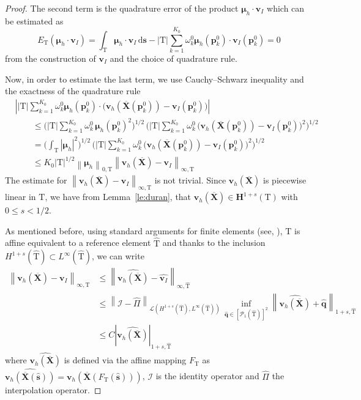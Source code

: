 \documentclass[oneside]{amsart} %
\newcommand{\norm}[1]{\left\lVert#1\right\rVert}
\newcommand{\abs}[1]{\left\lvert#1\right\rvert}
\renewcommand\v{\mathbf{v}} %
\newcommand\s{\mathbf{s}} %
\renewcommand\H{\mathbf{H}}
\newcommand\X{\mathbf{X}} %
\newcommand\Xbar{\overline{\X}} %
\newcommand\mmu{{\boldsymbol\mu}} %
\newcommand\ds{\mathrm{d}\s} %
\newcommand\quadnode{\mathbf{p}}
\newcommand\quadweigth{\omega}
\newcommand\Pcal{\mathcal{P}}
\newcommand\tri{\mathrm{T}} %
\newcommand\reftri{\widehat{\tri}} %
\begin{document}
\begin{proof}
		The second term is the quadrature error of the product $\mmu_h\cdot\v_I$ which
		can be estimated as
		\begin{equation}
			E_\tri(\mmu_h\cdot\v_I) = \int_\tri \mmu_h\cdot\v_I\,\ds
			- \abs{\tri}\sum_{k=1}^{K_0}\quadweigth_k^0\mmu_h(\quadnode_k^0)
			\cdot\v_I(\quadnode_k^0) = 0
		\end{equation}
		from the construction of $\v_I$ and the choice of quadrature rule.
		
		Now, in order to estimate the last term, we use Cauchy--Schwarz
		inequality and the exactness of the quadrature rule
		\begin{equation}\label{eq:3rd_part1_l2}
			\begin{aligned}
				&\abs{\abs{\tri} \sum_{k=1}^{K_0}\quadweigth_k^0 \mmu_h(\quadnode_k^0)\cdot
					\big(\v_h(\Xbar(\quadnode_k^0))-\v_I(\quadnode_k^0)\big)}\\
				&\qquad \le \bigg(\abs{\tri}
				\sum_{k=1}^{K_0}\quadweigth_k^0\,\mmu_h(\quadnode_k^0)^2 \bigg)^{1/2} \,
				\bigg(\abs{\tri}
				\sum_{k=1}^{K_0}\quadweigth_k^0\,
				\big(\v_h(\Xbar(\quadnode_k^0))-\v_I(\quadnode_k^0)\big)^2\bigg)^{1/2}\\
				&\qquad =\bigg(\int_\tri \abs{\mmu_h}^2\bigg)^{1/2}\, \bigg(\abs{\tri}
				\sum_{k=1}^{K_0}\quadweigth_k^0\,
				\big(\v_h(\Xbar(\quadnode_k^0))-\v_I(\quadnode_k^0)\big)^2\bigg)^{1/2}\\
				&\qquad \le K_0\abs{\tri}^{1/2}\norm{\mmu_h}_{0,\tri}
				\norm{\v_h(\Xbar)-\v_I}_{\infty,\tri}
			\end{aligned}
		\end{equation}
		The estimate for $\norm{\v_h(\Xbar)-\v_I}_{\infty,\tri}$ is not trivial.
		Since $\v_h(\Xbar)$ is piecewise linear in $\tri$, we have from
		Lemma~\ref{le:duran}, that
		$\v_h(\Xbar)\in \H^{1+s}(\tri)$ with $0\le s<1/2$.
		
		As mentioned before, using standard arguments for finite elements (see, \cite{ciarlet2002finite}),
		$\tri$ is affine equivalent to a reference element $\reftri$ and thanks to the
		inclusion $H^{1+s}(\reftri)\subset L^\infty(\reftri)$, we can
		write %
		\begin{equation}\label{eq:3rd_part3_l2}
			\begin{aligned}
				\norm{\v_h(\Xbar)-\v_I}_{\infty,\tri}
				&\le \norm{\widehat{\v_h(\Xbar)}-\widehat{\v_I}}_{\infty,\reftri}\\
				&\le \norm{\mathcal{I}-\widehat{\Pi}}_{\mathscr{L}(H^{1+s}(\reftri),L^\infty(\reftri))}\, \inf_{\widehat{\mathbf{q}}\in[\Pcal_1(\reftri)]^2} \norm{\widehat{\v_h(\Xbar)}+\widehat{\mathbf{q}}}_{1+s,\reftri}\\
				&\le C \abs{\widehat{\v_h(\Xbar)}}_{1+s,\reftri}
			\end{aligned}
		\end{equation}
		where $\widehat{\v_h(\Xbar)}$ is defined via the affine mapping $F_\tri$ as $\widehat{\v_h(\Xbar(\widehat{\s}))} = \v_h(\Xbar(F_\tri(\widehat{\s})))$, $\mathcal{I}$ is the identity operator and $\widehat{\Pi}$ the interpolation operator.
		

\end{proof}
\end{document}
